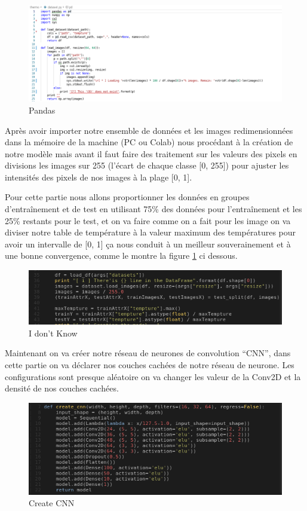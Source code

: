 \documentclass[12pt]{article}
\begin{document}
\newpage
\begin{figure}[h]
	\centering
	\includegraphics[width=16cm]{img-Chapiter-4/loaddataset.png}
	\caption{Pandas}
\end{figure}

Après avoir importer notre ensemble de données et les images redimensionnées dans la mémoire de la machine (PC ou Colab) nous procédant à la création de notre modèle mais avant il faut faire des traitement sur les valeurs des pixels en divisions les images sur 255 (l’écart de chaque classe [0, 255]) pour ajuster les intensités des pixels de nos images à la plage [0, 1].

Pour cette partie nous allons proportionner les données en groupes d’entraînement et de test en utilisant 75\% des données pour l’entraînement et les 25\% restants pour le test, et on va faire comme on a fait pour les image on va diviser notre table de température à la valeur maximum des températures pour avoir un intervalle de [0, 1] ça nous conduit à un meilleur souverainement et à une bonne convergence, comme le montre la figure \ref{fig:73} ci dessous.

\begin{figure}[h]
	\centering
	\includegraphics[width=15cm]{img-Chapiter-4/pretraitementimage.png}
	\caption{I don't Know}
	\label{fig:73}
\end{figure}

Maintenant on va créer notre réseau de neurones de convolution “CNN”, dans cette partie on va déclarer nos couches cachées de notre réseau de neurone. Les configurations sont presque aléatoire on va changer les valeur de la Conv2D et la densité de nos couches cachées.

\newpage
\begin{figure}[h]
	\centering
	\includegraphics[width=15cm]{img-Chapiter-4/createcnn.png}
	\caption{Create CNN}
\end{figure}
\end{document}
